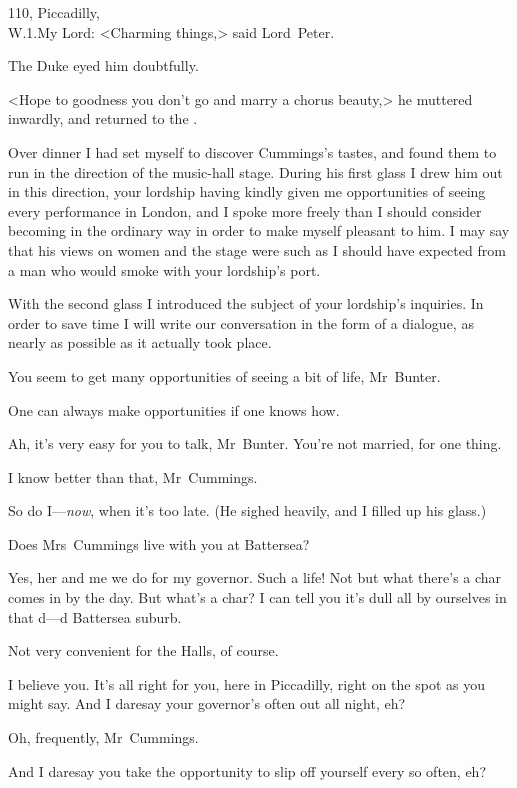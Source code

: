 \begin{mail}{110, Piccadilly,\\W\@.1.}{My Lord:}
<Charming things,> said Lord~Peter.

The Duke eyed him doubtfully.

<Hope to goodness you don't go and marry a chorus beauty,> he muttered inwardly, and returned to the .

\resumemail
Over dinner I had set myself to discover Cummings's tastes, and found them to run in the direction of the music-hall stage. During his first glass I drew him out in this direction, your lordship having kindly given me opportunities of seeing every performance in London, and I spoke more freely than I should consider becoming in the ordinary way in order to make myself pleasant to him. I may say that his views on women and the stage were such as I should have expected from a man who would smoke with your lordship's port.

With the second glass I introduced the subject of your lordship's inquiries. In order to save time I will write our conversation in the form of a dialogue, as nearly as possible as it actually took place.

\begin{dialogue}
 You seem to get many opportunities of seeing a bit of life, Mr~Bunter.

 One can always make opportunities if one knows how.

 Ah, it's very easy for you to talk, Mr~Bunter. You're not married, for one thing.

 I know better than that, Mr~Cummings.

 So do I—\emph{now}, when it's too late. (He sighed heavily, and I filled up his glass.)

 Does Mrs~Cummings live with you at Battersea?

 Yes, her and me we do for my governor. Such a life! Not but what there's a char comes in by the day. But what's a char? I can tell you it's dull all by ourselves in that d—d Battersea suburb.

 Not very convenient for the Halls, of course.

 I believe you. It's all right for you, here in Piccadilly, right on the spot as you might say. And I daresay your governor's often out all night, eh?

 Oh, frequently, Mr~Cummings.

 And I daresay you take the opportunity to slip off yourself every so often, eh?


\end{dialogue}
\end{mail}
